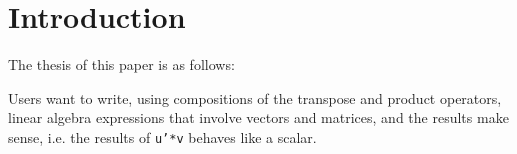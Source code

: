 \section{Introduction}

The thesis of this paper is as follows:

Users want to write, using compositions of the transpose and product operators, linear algebra expressions that involve vectors and matrices, and the results make sense, i.e. the results of \texttt{u'*v} behaves like a scalar.